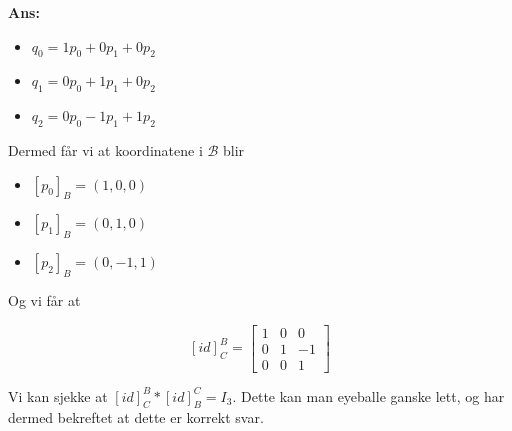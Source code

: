 \documentclass[11pt]{article}
\newenvironment{solbox}
  {\begin{mdframed}[linewidth=1pt,linecolor=black,roundcorner=5pt]
   \noindent\textbf{Ans: }\enspace}
  {\end{mdframed}}
\begin{document}
\begin{solbox}
 

  \begin{itemize}
    \item $ q_0=1p_0+0p_1+0p_2 $
    \item $ q_1=0p_0+1p_1+0p_2 $
    \item $ q_2=0p_0-1p_1+1p_2 $   
  \end{itemize}


  Dermed får vi at koordinatene i $ \mathcal{ B }$ blir
  
  \begin{itemize}
    \item $ \left[ p_0 \right]_B= \left( 1,0,0 \right)   $ 
    \item $ \left[ p_1 \right] _B = \left( 0,1,0 \right)  $ 
    \item $ \left[ p_2 \right] _B= \left( 0,-1,1 \right)  $ 
  \end{itemize}

  Og vi får at 

  \[
      \left[ id \right] _C^B = \begin{bmatrix}
        1&0&0\\
        0&1&-1\\
        0&0&1
      \end{bmatrix}
  \]
  

  Vi kan sjekke at $ \left[ id \right] _C^B * \left[ id \right] _B^C = I_3 $. Dette kan man eyeballe ganske lett, og har dermed bekreftet at dette er korrekt svar. 

\end{solbox}
\end{document}
